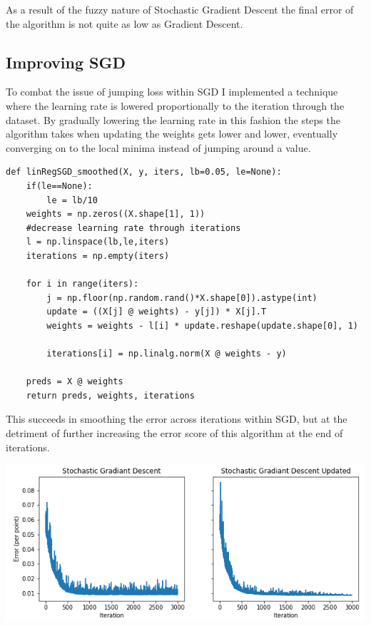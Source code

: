 \documentclass[sigconf]{acmart}
\begin{document}
As a result of the fuzzy nature of Stochastic Gradient Descent the final error of the algorithm is not quite as low as Gradient Descent. 
\subsection{Improving SGD}
To combat the issue of jumping loss within SGD I implemented a technique where the learning rate is lowered proportionally to the iteration through the dataset. By gradually lowering the learning rate in this fashion the steps the algorithm takes when updating the weights gets lower and lower, eventually converging on to the local minima instead of jumping around a value.
\begin{listing}[H]
    \begin{verbatim}
def linRegSGD_smoothed(X, y, iters, lb=0.05, le=None):
    if(le==None):
        le = lb/10
    weights = np.zeros((X.shape[1], 1))
    #decrease learning rate through iterations
    l = np.linspace(lb,le,iters)
    iterations = np.empty(iters)
    
    for i in range(iters):  
        j = np.floor(np.random.rand()*X.shape[0]).astype(int)
        update = ((X[j] @ weights) - y[j]) * X[j].T
        weights = weights - l[i] * update.reshape(update.shape[0], 1)
      
        iterations[i] = np.linalg.norm(X @ weights - y)
        
    preds = X @ weights
    return preds, weights, iterations
    \end{verbatim}
\end{listing}
This succeeds in smoothing the error across iterations within SGD, but at the detriment of further increasing the error score of this algorithm at the end of iterations.

\begin{center}
    \includegraphics[width=\linewidth]{figs/SGDFixed.png}
\end{center}
\end{document}
